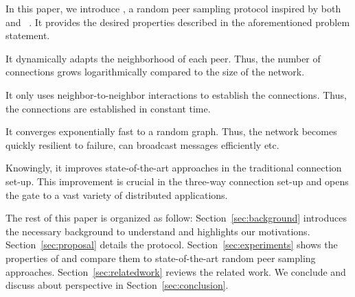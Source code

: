 In this paper, we introduce \SCAMPLON{}, a random peer sampling protocol
inspired by both \SCAMP{}~\cite{ganesh2003peer} and
\CYCLON{}~\cite{voulgaris2005cyclon}. It provides the desired properties
described in the aforementioned problem statement.
\begin{inparaenum}[(i)]
\item It dynamically adapts the neighborhood of each peer. Thus, the number of
  connections grows logarithmically compared to the size of the network.
\item It only uses neighbor-to-neighbor interactions to establish the
  connections. Thus, the connections are established in constant time.
\item It converges exponentially fast to a random graph. Thus, the network
  becomes quickly resilient to failure, can broadcast messages efficiently etc.
\end{inparaenum}
Knowingly, it improves state-of-the-art approaches in the traditional
connection set-up. This improvement is crucial in the three-way connection
set-up and opens the gate to a vast variety of distributed applications.


The rest of this paper is organized as follow: Section~\ref{sec:background}
introduces the necessary background to understand \SCAMPLON{} and highlights
our motivations. Section~\ref{sec:proposal} details the \SCAMPLON{} protocol.
Section~\ref{sec:experiments} shows the properties of \SCAMPLON{} and compare
them to state-of-the-art random peer sampling
approaches. Section~\ref{sec:relatedwork} reviews the related work. We conclude
and discuss about perspective in Section~\ref{sec:conclusion}.

